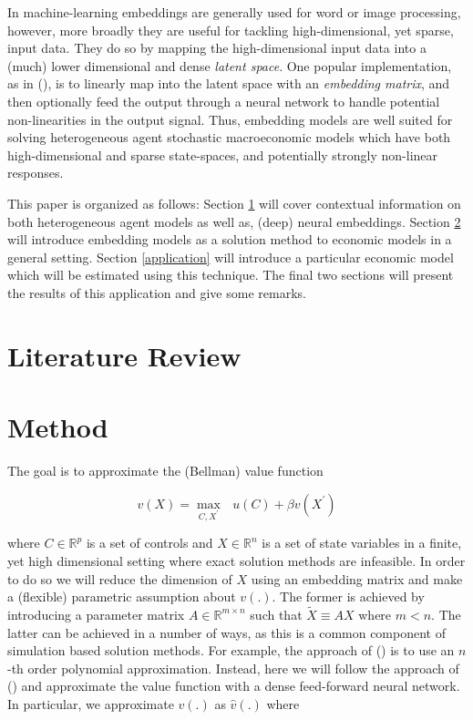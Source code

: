 \documentclass{article}
\begin{document}
In machine-learning embeddings are generally used for word or image processing, however, more broadly they are useful for tackling high-dimensional, yet sparse, input data. They do so by mapping the high-dimensional input data into a (much) lower dimensional and dense \textit{latent space}. One popular implementation, as in \citeauthor{bengio2003neural} (\citeyear{bengio2003neural}), is to linearly map into the latent space with an \textit{embedding matrix}, and then optionally feed the output through a neural network to handle potential non-linearities in the output signal. Thus, embedding models are well suited for solving heterogeneous agent stochastic macroeconomic models which have both high-dimensional and sparse state-spaces, and potentially strongly non-linear responses.

This paper is organized as follows: Section \ref{lit_review} will cover contextual information on both heterogeneous agent models as well as, (deep) neural embeddings. Section \ref{method} will introduce embedding models as a solution method to economic models in a general setting. Section \ref{application} will introduce a particular economic model which will be estimated using this technique. The final two sections will present the results of this application and give some remarks.

\section{Literature Review} \label{lit_review}

\section{Method} \label{method}

The goal is to approximate the (Bellman) value function 

\begin{equation}
    v(X) = \underset{C, X^\prime}{\max} \text{  } u(C) + \beta v(X^\prime) 
\end{equation}

where $C \in \mathbb{R}^p$ is a set of controls and $X \in \mathbb{R}^n$ is a set of state variables in a finite, yet high dimensional setting where exact solution methods are infeasible. In order to do so we will reduce the dimension of $X$ using an embedding matrix and make a (flexible) parametric assumption about $v(.)$. The former is achieved by introducing a parameter matrix $A \in \mathbb{R}^{m \times n}$ such that $\widetilde{X} \equiv AX$ where $m < n$. The latter can be achieved in a number of ways, as this is a common component of simulation based solution methods. For example, the approach of \citeauthor{den1996heterogeneity} (\citeyear{den1996heterogeneity}) is to use an $n$-th order polynomial approximation. Instead, here we will follow the approach of \citeauthor{duarte2018machine} (\citeyear{duarte2018machine}) and approximate the value function with a dense feed-forward neural network. In particular, we approximate $v(.)$ as $\hat{v}(.)$ where
\end{document}
